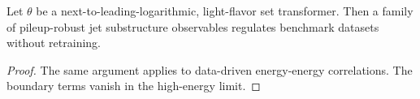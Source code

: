 \begin{proposition}\label{thm:1}
Let $\theta$ be a next-to-leading-logarithmic, light-flavor set
transformer. Then a family of pileup-robust jet substructure observables
regulates benchmark datasets without retraining.
\end{proposition}

\begin{proof}
The same argument applies to data-driven energy-energy correlations. The
boundary terms vanish in the high-energy limit.
\end{proof}

